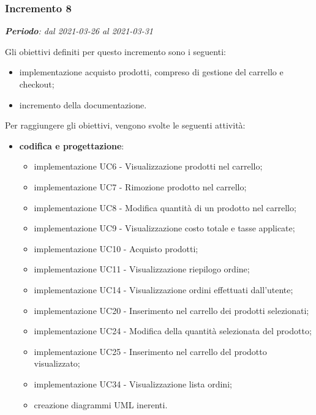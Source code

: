 \subsubsection{Incremento 8}
\textit{\textbf{Periodo}: dal 2021-03-26 al 2021-03-31}

Gli obiettivi definiti per questo incremento sono i seguenti:
\begin{itemize}
\item implementazione acquisto prodotti, compreso di gestione del carrello e checkout;
\item incremento della documentazione.
\end{itemize}

Per raggiungere gli obiettivi, vengono svolte le seguenti attività:
\begin{itemize}

\item \textbf{codifica e progettazione}:
\begin{itemize}
\item implementazione UC6 - Visualizzazione prodotti nel carrello;
\item implementazione UC7 - Rimozione prodotto nel carrello;
\item implementazione UC8 - Modifica quantità di un prodotto nel carrello;
\item implementazione UC9 -  Visualizzazione costo totale e tasse applicate;
\item implementazione UC10 - Acquisto prodotti;
\item implementazione UC11 - Visualizzazione riepilogo ordine;
\item implementazione UC14 - Visualizzazione ordini effettuati dall’utente;
\item implementazione UC20 - Inserimento nel carrello dei prodotti selezionati;
\item implementazione UC24 - Modifica della quantità selezionata del prodotto;
\item implementazione UC25 - Inserimento nel carrello del prodotto visualizzato;
\item implementazione UC34 -  Visualizzazione lista ordini;
\item creazione diagrammi UML inerenti.

\end{itemize}


\end{itemize}

